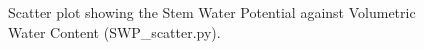 \documentclass[12pt]{scrartcl}
\begin{document}
\begin{figure}[!htb]
        \caption{\label{fig:SWP_facet} Scatter plot showing the Stem Water Potential against Volumetric Water Content (SWP\_scatter.py).}
\end{figure}
\end{document}
